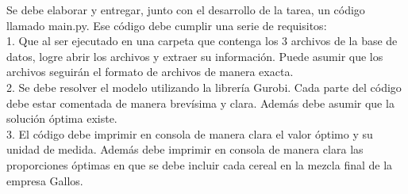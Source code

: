 \documentclass[addpoints,10pt]{exam}
\begin{document}
\begin{questions}
Se debe elaborar y entregar, junto con el desarrollo de la tarea, un código llamado main.py. Ese código debe cumplir una serie de requisitos:\\
1. Que al ser ejecutado en una carpeta que contenga los 3 archivos de la base de datos, logre abrir los archivos y extraer su información. Puede asumir que los archivos seguirán el formato de archivos de manera exacta.\\
2. Se debe resolver el modelo utilizando la librería Gurobi. Cada parte del código debe estar comentada de manera brevísima y clara. Además debe asumir que la solución óptima existe.\\
3. El código debe imprimir en consola de manera clara el valor óptimo y su unidad de medida. Además debe imprimir en consola de manera clara las proporciones óptimas en que se debe incluir cada cereal en la mezcla final de la empresa Gallos.
\end{questions}
\end{document}
